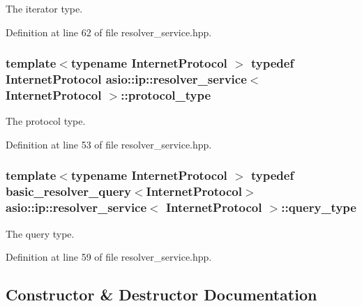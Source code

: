 The iterator type. 



Definition at line 62 of file resolver\+\_\+service.\+hpp.

\hypertarget{classasio_1_1ip_1_1resolver__service_a69654a63222789b8c363f3054ff01fa6}{}
\subsubsection[{protocol\+\_\+type}]{\setlength{\rightskip}{0pt plus 5cm}template$<$typename Internet\+Protocol $>$ typedef Internet\+Protocol {\bf asio\+::ip\+::resolver\+\_\+service}$<$ Internet\+Protocol $>$\+::{\bf protocol\+\_\+type}}\label{classasio_1_1ip_1_1resolver__service_a69654a63222789b8c363f3054ff01fa6}


The protocol type. 



Definition at line 53 of file resolver\+\_\+service.\+hpp.

\hypertarget{classasio_1_1ip_1_1resolver__service_a60008f0c960687605c978dff14011145}{}
\subsubsection[{query\+\_\+type}]{\setlength{\rightskip}{0pt plus 5cm}template$<$typename Internet\+Protocol $>$ typedef {\bf basic\+\_\+resolver\+\_\+query}$<$Internet\+Protocol$>$ {\bf asio\+::ip\+::resolver\+\_\+service}$<$ Internet\+Protocol $>$\+::{\bf query\+\_\+type}}\label{classasio_1_1ip_1_1resolver__service_a60008f0c960687605c978dff14011145}


The query type. 



Definition at line 59 of file resolver\+\_\+service.\+hpp.



\subsection{Constructor \& Destructor Documentation}
\hypertarget{classasio_1_1ip_1_1resolver__service_a61456218a5d45785201a1384ee1874c9}{}
